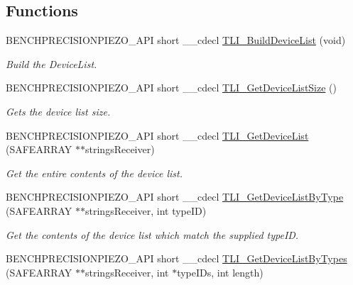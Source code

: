 \subsection*{Functions}
\begin{DoxyCompactItemize}
\item 
B\+E\+N\+C\+H\+P\+R\+E\+C\+I\+S\+I\+O\+N\+P\+I\+E\+Z\+O\+\_\+\+A\+PI short \+\_\+\+\_\+cdecl \hyperlink{group___benchtop_precision_piezo_gae11511969cf5d93adecc8136c70443ef}{T\+L\+I\+\_\+\+Build\+Device\+List} (void)
\begin{DoxyCompactList}\small\item\em Build the Device\+List. \end{DoxyCompactList}\item 
B\+E\+N\+C\+H\+P\+R\+E\+C\+I\+S\+I\+O\+N\+P\+I\+E\+Z\+O\+\_\+\+A\+PI short \+\_\+\+\_\+cdecl \hyperlink{group___benchtop_precision_piezo_ga08ac87ee2ff29be6ae4e4d8523519a17}{T\+L\+I\+\_\+\+Get\+Device\+List\+Size} ()
\begin{DoxyCompactList}\small\item\em Gets the device list size. \end{DoxyCompactList}\item 
B\+E\+N\+C\+H\+P\+R\+E\+C\+I\+S\+I\+O\+N\+P\+I\+E\+Z\+O\+\_\+\+A\+PI short \+\_\+\+\_\+cdecl \hyperlink{group___benchtop_precision_piezo_ga2a06a9792c05b94a0e929a77852473e0}{T\+L\+I\+\_\+\+Get\+Device\+List} (S\+A\+F\+E\+A\+R\+R\+AY $\ast$$\ast$strings\+Receiver)
\begin{DoxyCompactList}\small\item\em Get the entire contents of the device list. \end{DoxyCompactList}\item 
B\+E\+N\+C\+H\+P\+R\+E\+C\+I\+S\+I\+O\+N\+P\+I\+E\+Z\+O\+\_\+\+A\+PI short \+\_\+\+\_\+cdecl \hyperlink{group___benchtop_precision_piezo_ga54bd34e8c76b751fbc4daa839e6d3a2e}{T\+L\+I\+\_\+\+Get\+Device\+List\+By\+Type} (S\+A\+F\+E\+A\+R\+R\+AY $\ast$$\ast$strings\+Receiver, int type\+ID)
\begin{DoxyCompactList}\small\item\em Get the contents of the device list which match the supplied type\+ID. \end{DoxyCompactList}\item 
B\+E\+N\+C\+H\+P\+R\+E\+C\+I\+S\+I\+O\+N\+P\+I\+E\+Z\+O\+\_\+\+A\+PI short \+\_\+\+\_\+cdecl \hyperlink{group___benchtop_precision_piezo_ga65c38161acad8f75e8976cc8235698d0}{T\+L\+I\+\_\+\+Get\+Device\+List\+By\+Types} (S\+A\+F\+E\+A\+R\+R\+AY $\ast$$\ast$strings\+Receiver, int $\ast$type\+I\+Ds, int length)
$$
\end{DoxyCompactItemize}
